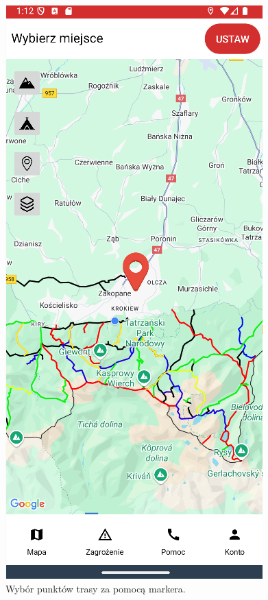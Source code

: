 \begin{figure}[H]
    \centering
    \includegraphics[scale=0.6]{img/imp/widok-marker.png}
    \caption{Wybór punktów trasy za pomocą markera.}
    \label{widok:ustawlokalizacje}
\end{figure}


